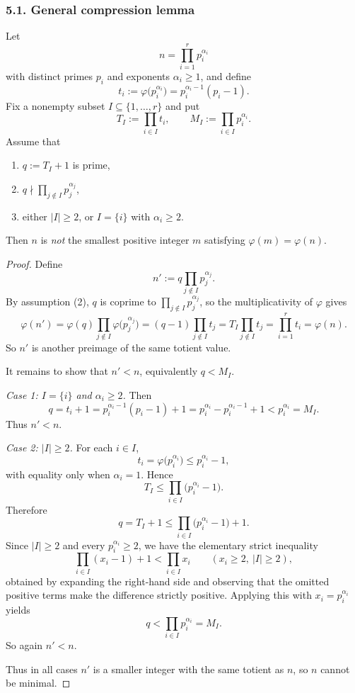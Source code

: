 \subsubsection*{5.1. General compression lemma}
\begin{proposition}
Let
\[
 n=\prod_{i=1}^r p_i^{\alpha_i}
\]
with distinct primes $p_i$ and exponents $\alpha_i\ge 1$, and define
\[
 t_i:=\varphi\!\bigl(p_i^{\alpha_i}\bigr)=p_i^{\alpha_i-1}(p_i-1).
\]
Fix a nonempty subset $I\subseteq\{1,\dots,r\}$ and put
\[
 T_I:=\prod_{i\in I} t_i,
 \qquad
 M_I:=\prod_{i\in I} p_i^{\alpha_i}.
\]
Assume that
\begin{enumerate}
\item $q:=T_I+1$ is prime,
\item $q\nmid \prod_{j\notin I} p_j^{\alpha_j}$,
\item either $|I|\ge 2$, or $I=\{i\}$ with $\alpha_i\ge 2$.
\end{enumerate}
Then $n$ is \emph{not} the smallest positive integer $m$ satisfying $\varphi(m)=\varphi(n)$.
\end{proposition}

\begin{proof}
Define
\[
 n':=q\prod_{j\notin I} p_j^{\alpha_j}.
\]
By assumption (2), $q$ is coprime to $\prod_{j\notin I} p_j^{\alpha_j}$, so the multiplicativity of $\varphi$ gives
\[
 \varphi(n')=\varphi(q)\prod_{j\notin I} \varphi\!\bigl(p_j^{\alpha_j}\bigr)
 =(q-1)\prod_{j\notin I} t_j
 =T_I\prod_{j\notin I} t_j
 =\prod_{i=1}^r t_i
 =\varphi(n).
\]
So $n'$ is another preimage of the same totient value.

It remains to show that $n'<n$, equivalently $q<M_I$.

\smallskip
\noindent\emph{Case 1: $I=\{i\}$ and $\alpha_i\ge 2$.}
Then
\[
 q=t_i+1=p_i^{\alpha_i-1}(p_i-1)+1
 =p_i^{\alpha_i}-p_i^{\alpha_i-1}+1
 <p_i^{\alpha_i}=M_I.
\]
Thus $n'<n$.

\smallskip
\noindent\emph{Case 2: $|I|\ge 2$.}
For each $i\in I$,
\[
 t_i=\varphi\!\bigl(p_i^{\alpha_i}\bigr)\le p_i^{\alpha_i}-1,
\]
with equality only when $\alpha_i=1$. Hence
\[
 T_I\le \prod_{i\in I}\bigl(p_i^{\alpha_i}-1\bigr).
\]
Therefore
\[
 q=T_I+1\le \prod_{i\in I}\bigl(p_i^{\alpha_i}-1\bigr)+1.
\]
Since $|I|\ge 2$ and every $p_i^{\alpha_i}\ge 2$, we have the elementary strict inequality
\[
 \prod_{i\in I}(x_i-1)+1<\prod_{i\in I}x_i
 \qquad (x_i\ge 2,\ |I|\ge 2),
\]
obtained by expanding the right-hand side and observing that the omitted positive terms make the difference strictly positive.
Applying this with $x_i=p_i^{\alpha_i}$ yields
\[
 q<\prod_{i\in I} p_i^{\alpha_i}=M_I.
\]
So again $n'<n$.

Thus in all cases $n'$ is a smaller integer with the same totient as $n$, so $n$ cannot be minimal.
\end{proof}

